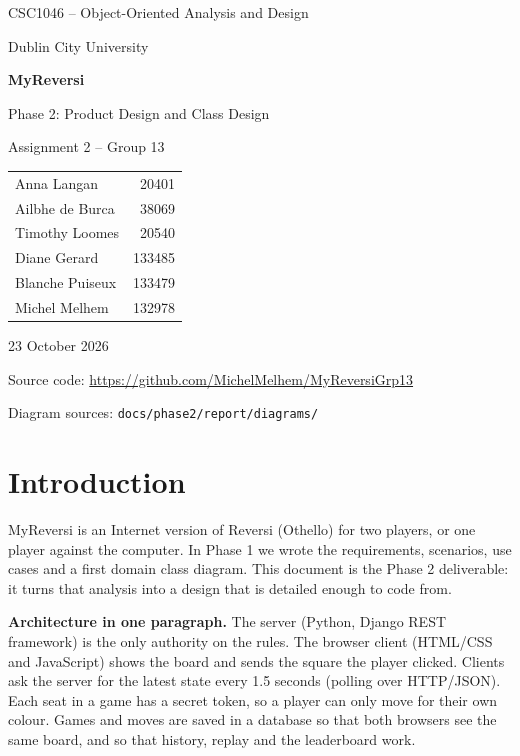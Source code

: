 \documentclass[11pt,a4paper]{article}
\begin{document}
\begin{titlepage}
\centering
\vspace*{2cm}
{\large CSC1046 -- Object-Oriented Analysis and Design\par}
{\large Dublin City University\par}
\vspace{2.5cm}
{\Huge\bfseries MyReversi\par}
\vspace{0.8cm}
{\LARGE Phase 2: Product Design and Class Design\par}
\vspace{0.4cm}
{\Large Assignment 2 -- Group 13\par}
\vspace{2.5cm}
\begin{tabular}{l r}
Anna Langan & 20401\\
Ailbhe de Burca & 38069\\
Timothy Loomes & 20540\\
Diane Gerard & 133485\\
Blanche Puiseux & 133479\\
Michel Melhem & 132978\\
\end{tabular}
\vfill
{\large 23 October 2026\par}
\vspace{0.5cm}
Source code: \url{https://github.com/MichelMelhem/MyReversiGrp13}\par
Diagram sources: \texttt{docs/phase2/report/diagrams/}\par
\end{titlepage}

\tableofcontents
\newpage

\section{Introduction}

MyReversi is an Internet version of Reversi (Othello) for two players, or one player against the computer. In Phase 1 we wrote the requirements, scenarios, use cases and a first domain class diagram. This document is the Phase 2 deliverable: it turns that analysis into a design that is detailed enough to code from.

\textbf{Architecture in one paragraph.} The server (Python, Django REST framework) is the only authority on the rules. The browser client (HTML/CSS and JavaScript) shows the board and sends the square the player clicked. Clients ask the server for the latest state every 1.5 seconds (polling over HTTP/JSON). Each seat in a game has a secret token, so a player can only move for their own colour. Games and moves are saved in a database so that both browsers see the same board, and so that history, replay and the leaderboard work.
\end{document}
